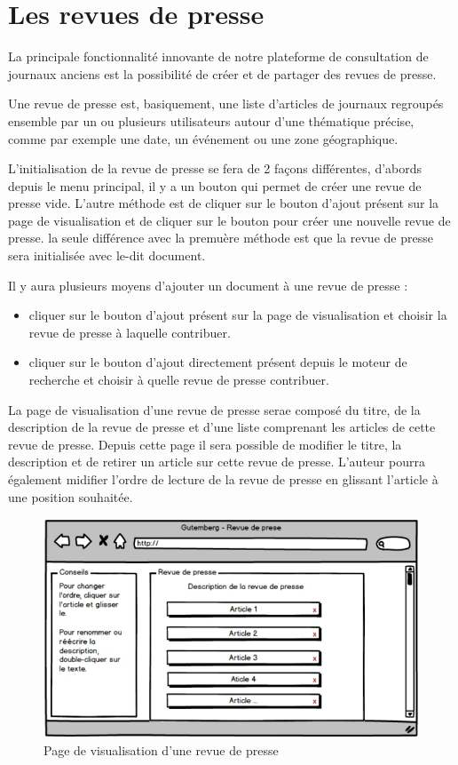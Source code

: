 \section{Les revues de presse}
\label{sec:revue}

La principale fonctionnalité innovante de notre plateforme de consultation de journaux anciens est la possibilité de
créer et de partager des revues de presse.

Une revue de presse est, basiquement, une liste d'articles de journaux regroupés ensemble par un ou plusieurs utilisateurs autour d'une thématique précise,
comme par exemple une date, un événement ou une zone géographique.

L'initialisation de la revue de presse se fera de 2 façons différentes, d'abords depuis le menu principal, il y a un bouton qui permet de créer
une revue de presse vide. L'autre méthode est de cliquer sur le bouton d'ajout présent sur la page de visualisation et de cliquer
sur le bouton pour créer une nouvelle revue de presse.
la seule différence avec la premuère méthode est que la revue de presse sera initialisée avec le-dit document.

Il y aura plusieurs moyens d'ajouter un document à une revue de presse :

\begin{itemize}
  \item cliquer sur le bouton d'ajout présent sur la page de visualisation et choisir la
revue de presse à laquelle contribuer.
  \item cliquer sur le bouton d'ajout directement présent depuis le moteur de recherche et choisir
à quelle revue de presse contribuer.
  \end{itemize}

La page de visualisation d'une revue de presse serae composé du titre, de la description de la revue de presse et d'une liste comprenant les articles
de cette revue de presse. Depuis cette page il sera possible de modifier le titre, la description et de retirer un article sur cette revue de presse.
L'auteur pourra également midifier l'ordre de lecture de la revue de presse en glissant l'article à une position souhaitée.

\begin{figure}[H]
    \centering
    \includegraphics[width=\textwidth]{figures/revue.png}
    \caption{Page de visualisation d'une revue de presse}
    \label{fig:revue}
\end{figure}

